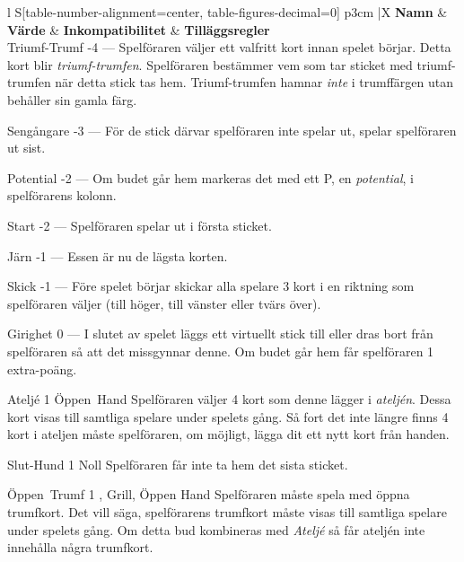 \begin{table}
	\caption{Specialbud}\label{tab:specialBids}
	\begin{center}
		\begin{tabularx}{\textwidth}{
			l
			S[table-number-alignment=center, table-figures-decimal=0]
			p{3cm}
			|X
		}
			\textbf{Namn} &
			\textbf{Värde} &
			\textbf{Inkompatibilitet} &
			\textbf{Tilläggsregler}
			\\[-3ex]

			\specialBidItem%
			{Triumf-Trumf}
			{-4}
			{---}
			{%
				Spelföraren väljer ett valfritt kort innan spelet börjar. Detta kort blir \emph{triumf-trumfen}. Spelföraren bestämmer vem som tar sticket med triumf-trumfen när detta stick tas hem. Triumf-trumfen hamnar \emph{inte} i trumffärgen utan behåller sin gamla färg.
			}

			\specialBidItem%
			{Sengångare}
			{-3}
			{---}
			{%
				För de stick därvar spelföraren inte spelar ut, spelar spelföraren ut sist.
			}

			\specialBidItem%
			{Potential}
			{-2}
			{---}
			{%
				Om budet går hem markeras det med ett P, en \emph{potential}, i spelförarens kolonn.
			}

			\specialBidItem%
			{Start}
			{-2}
			{---}
			{%
				Spelföraren spelar ut i första sticket.
			}

			\specialBidItem%
			{Järn}
			{-1}
			{---}
			{%
				Essen är nu de lägsta korten.
			}

			\specialBidItem%
			{Skick}
			{-1}
			{---}
			{%
				Före spelet börjar skickar alla spelare 3 kort i en riktning som spelföraren väljer (till höger, till vänster eller tvärs över).
			}

			\specialBidItem%
			{Girighet}
			{0}
			{---}
			{%
				I slutet av spelet läggs ett virtuellt stick till eller dras bort från spelföraren så att det missgynnar denne. Om budet går hem får spelföraren 1 extra-poäng.
			}

			\specialBidItem%
			{Ateljé}
			{1}
			{Öppen~Hand}
			{%
				Spelföraren väljer 4 kort som denne lägger i \emph{ateljén}. Dessa kort visas till samtliga spelare under spelets gång. Så fort det inte längre finns 4 kort i ateljen måste spelföraren, om möjligt, lägga dit ett nytt kort från handen.
			}

			\specialBidItem%
			{Slut-Hund}
			{1}
			{Noll}
			{%
				Spelföraren får inte ta hem det sista sticket.
			}

			\specialBidItem%
			{Öppen~Trumf}
			{1}
			{\nonTrump, Grill, Öppen Hand}
			{%
				Spelföraren måste spela med öppna trumfkort. Det vill säga, spelförarens trumfkort måste visas till samtliga spelare under spelets gång. Om detta bud kombineras med \emph{Ateljé} så får ateljén inte innehålla några trumfkort.
			}


\end{tabularx}
\end{center}
\end{table}
